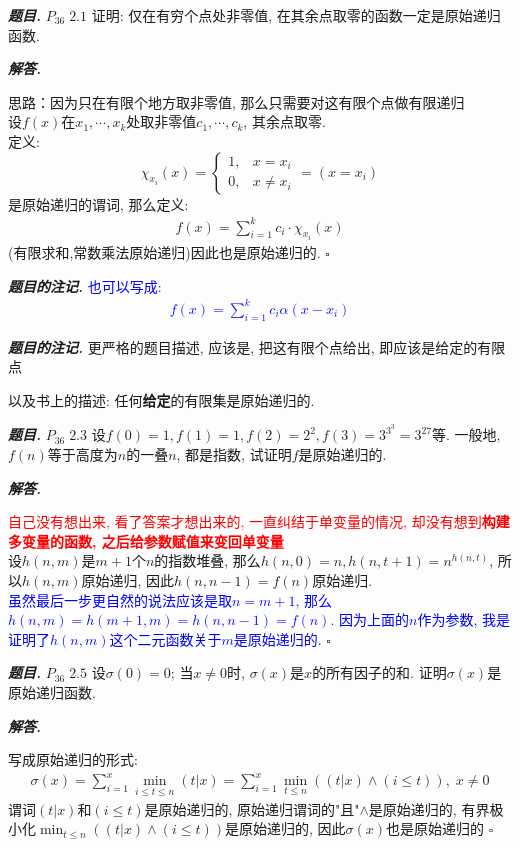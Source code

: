 \documentclass[10pt, a4paper, oneside]{ctexart}
\newenvironment{problem}{\begin{framed}\par\noindent\textbf{\textit{题目. }}}{\end{framed}\par}
\newenvironment{solution}{%
  \par\noindent\textbf{\textit{解答. }}\ignorespaces
}{%
  \hfill\ensuremath{\square}\par
}
\newenvironment{note}{\par\noindent\textbf{\textit{题目的注记. }}\ignorespaces}{\par}
\begin{document}
\begin{problem}
$P_{36}\; 2.1$ 证明: 仅在有穷个点处非零值, 在其余点取零的函数一定是原始递归函数.
\end{problem}
\begin{solution}
 思路：因为只在有限个地方取非零值, 那么只需要对这有限个点做有限递归\\
设$f(x)$在$x_1,\cdots,x_k$处取非零值$c_1,\cdots,c_k$, 其余点取零.\\
定义:
$$\chi_{x_i}(x)=\begin{cases}
    1,&x=x_i\\
    0,&x\neq x_i
\end{cases}=(x=x_i)$$
是原始递归的谓词, 那么定义:
\begin{align*}
    f(x)=\sum_{i=1}^{k}c_i\cdot\chi_{x_i}(x)
\end{align*}
(有限求和,常数乘法原始递归)因此也是原始递归的.
\end{solution}
\begin{note}
    \textcolor{blue}{也可以写成:\begin{align*}f(x)=\sum_{i=1}^{k}c_i \alpha(x-x_i)\end{align*} }
\end{note}
\begin{note}
更严格的题目描述, 应该是, 把这有限个点给出, 即应该是给定的有限点

以及书上的描述: 任何\textbf{给定}的有限集是原始递归的.
\end{note}

\begin{problem}
$P_{36}\;2.3$ 设$f(0)=1,f(1)=1,f(2)=2^2,f(3)=3^{3^3}=3^{27}$等. 一般地, $f(n)$等于高度为$n$的一叠$n$, 都是指数, 试证明$f$是原始递归的. 
\end{problem}
\begin{solution}
\textcolor{red}{自己没有想出来, 看了答案才想出来的, 一直纠结于单变量的情况, 却没有想到\textbf{构建多变量的函数, 之后给参数赋值来变回单变量}}\\
设$h(n,m)$是$m+1$个$n$的指数堆叠, 那么$h(n,0)=n,h(n,t+1)=n^{h(n,t)}$, 所以$h(n,m)$原始递归, 因此$h(n,n-1)=f(n)$原始递归.\\
\textcolor{blue}{虽然最后一步更自然的说法应该是取$n=m+1$, 那么$h(n,m)=h(m+1,m)=h(n,n-1)=f(n)$. 因为上面的$n$作为参数, 我是证明了$h(n,m)$这个二元函数关于$m$是原始递归的.}
\end{solution}

\begin{problem}
$P_{36}\;2.5$ 设$\sigma(0)=0$; 当$x\neq 0$时, $\sigma(x)$是$x$的所有因子的和. 证明$\sigma(x)$是原始递归函数.
\end{problem}
\begin{solution}
写成原始递归的形式:
\begin{align*}
    \sigma(x)=\sum_{i=1}^x \min_{i\leq t\leq n} \left(t|x\right)=\sum_{i=1}^x \min_{t\leq n} \left((t|x) \wedge (i\leq t) \right),\; x\neq 0
\end{align*}
谓词$(t|x)$和$(i\leq t)$是原始递归的, 原始递归谓词的"且"$\wedge$是原始递归的, 有界极小化$\min_{t\leq n} \left((t|x) \wedge (i\leq t) \right)$是原始递归的, 因此$\sigma(x)$也是原始递归的
\end{solution}
\end{document}
